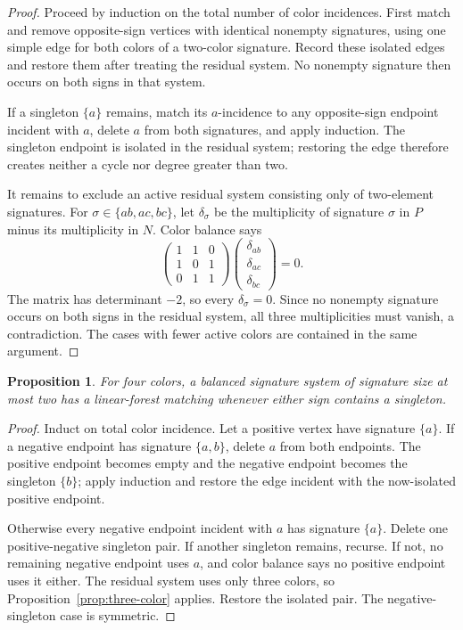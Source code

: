 \documentclass[11pt]{article}
\newtheorem{proposition}[theorem]{Proposition}
\theoremstyle{definition}
\theoremstyle{remark}
\numberwithin{equation}{section}
\begin{document}
\begin{proof}
Proceed by induction on the total number of color incidences.  First match and
remove opposite-sign vertices with identical nonempty signatures, using one
simple edge for both colors of a two-color signature.  Record these isolated
edges and restore them after treating the residual system.  No nonempty
signature then occurs on both signs in that system.

If a singleton \(\{a\}\) remains, match its \(a\)-incidence to any
opposite-sign endpoint incident with \(a\), delete \(a\) from both signatures,
and apply induction.  The singleton endpoint is isolated in the residual
system; restoring the edge therefore creates neither a cycle nor degree
greater than two.

It remains to exclude an active residual system consisting only of
two-element signatures.  For \(\sigma\in\{ab,ac,bc\}\), let \(\delta_\sigma\)
be the multiplicity of signature \(\sigma\) in \(P\) minus its multiplicity
in \(N\).  Color balance says
\[
\begin{pmatrix}1&1&0\\1&0&1\\0&1&1\end{pmatrix}
\begin{pmatrix}
\delta_{ab}\\\delta_{ac}\\\delta_{bc}
\end{pmatrix}
=0.
\]
The matrix has determinant \(-2\), so every \(\delta_\sigma=0\).  Since no
nonempty signature occurs on both signs in the residual system, all three
multiplicities must vanish, a contradiction.  The cases with fewer active
colors are contained in the same argument.
\end{proof}

\begin{proposition}
\label{prop:four-singleton}
For four colors, a balanced signature system of signature size at most two
has a linear-forest matching whenever either sign contains a singleton.
\end{proposition}

\begin{proof}
Induct on total color incidence.  Let a positive vertex have signature
\(\{a\}\).  If a negative endpoint has signature \(\{a,b\}\), delete
\(a\) from both endpoints.  The positive endpoint becomes empty and the
negative endpoint becomes the singleton \(\{b\}\); apply induction and
restore the edge incident with the now-isolated positive endpoint.

Otherwise every negative endpoint incident with \(a\) has signature
\(\{a\}\).  Delete one positive-negative singleton pair.  If another
singleton remains, recurse.  If not, no remaining negative endpoint uses
\(a\), and color balance says no positive endpoint uses it either.  The
residual system uses only three colors, so
Proposition~\ref{prop:three-color} applies.  Restore the isolated pair.
The negative-singleton case is symmetric.
\end{proof}
\end{document}

